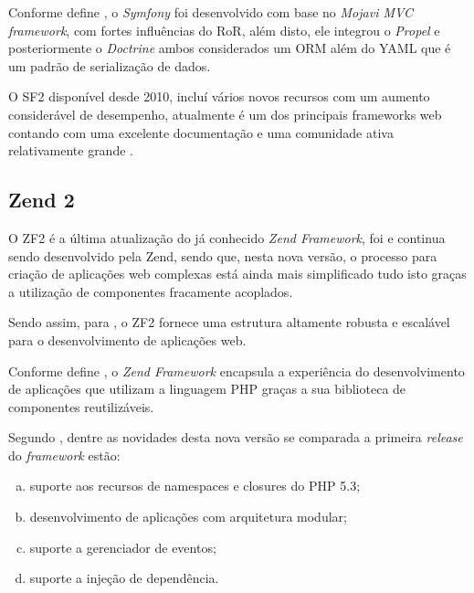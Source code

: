 Conforme define
, o
\textit{Symfony} foi desenvolvido com base no \textit{Mojavi MVC framework}, 
com fortes influências do \ac{RoR}, além disto, ele integrou o \textit{Propel} e
posteriormente o \textit{Doctrine} ambos considerados um \ac{ORM} além do
\ac{YAML} que é um padrão de serialização de dados.

O \ac{SF2} disponível desde 2010, incluí vários novos recursos com um aumento
considerável de desempenho, atualmente é um dos principais frameworks web
contando com uma excelente documentação e uma comunidade ativa relativamente
grande \cite{buildingPHPApplicationsWithSymfonyCakePHPAndZendFramework}.

\subsection{Zend 2}

O \ac{ZF2} é a última atualização do já conhecido \textit{Zend
Framework}, foi e continua sendo desenvolvido pela \acs{Zend}, sendo que, nesta
nova versão, o processo para criação de aplicações web complexas está ainda mais
simplificado tudo isto graças a utilização de componentes fracamente acoplados.

Sendo assim, para , o
\acs{ZF2} fornece uma estrutura altamente robusta e escalável para o 
desenvolvimento de aplicações web.

Conforme define
, o 
\textit{Zend Framework} encapsula a experiência do desenvolvimento de aplicações
que utilizam a linguagem \acs{PHP} graças a sua biblioteca de componentes reutilizáveis.

Segundo , dentre as novidades
desta nova versão se comparada a primeira \textit{release} do \textit{framework}
estão:

\begin{enumerate}[a)]
    \item suporte aos recursos de namespaces e closures do \acs{PHP} 5.3;
    \item desenvolvimento de aplicações com arquitetura modular;
    \item suporte a gerenciador de eventos;
    \item suporte a injeção de dependência.
\end{enumerate}